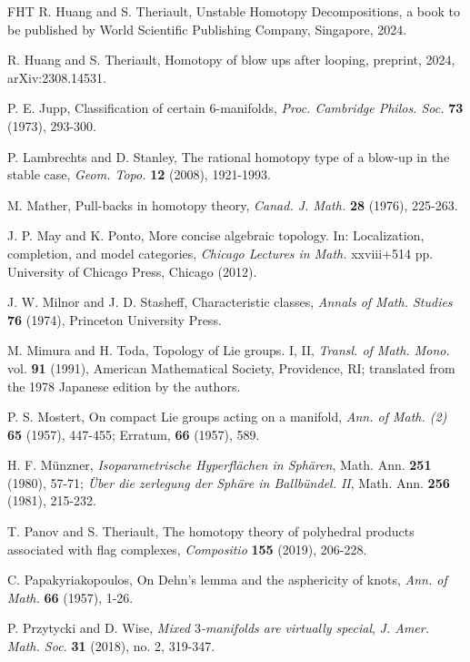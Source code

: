 \documentclass[a4]{amsart}
\theoremstyle{definition}
\begin{document}
\begin{sloppypar}
\begin{thebibliography}{FHT}
 R. Huang and S. Theriault, Unstable Homotopy Decompositions, a book to be published by World Scientific Publishing Company, Singapore, 2024.  

 R. Huang and S. Theriault, Homotopy of blow ups after looping, preprint, 2024, arXiv:2308.14531. 


 P. E. Jupp, Classification of certain $6$-manifolds, 
\emph{Proc. Cambridge Philos. Soc.} \textbf{73} (1973), 293-300.


 P. Lambrechts and D. Stanley, The rational homotopy type of a blow-up in the stable case, \emph{Geom. Topo.} \textbf{12} (2008), 1921-1993.

 M. Mather, Pull-backs in homotopy theory, \emph{Canad. J. Math.}
   \textbf{28} (1976), 225-263. 
   
 J. P. May and K. Ponto, More concise algebraic topology. In: Localization, completion, and model categories, \emph{Chicago Lectures in Math.} xxviii+514 pp. University of Chicago Press, Chicago (2012).
   
  J. W. Milnor and J. D. Stasheff, Characteristic classes, \emph{Annals of Math. Studies} \textbf{76} (1974), Princeton University Press. 
 
 
  M. Mimura and H. Toda, Topology of Lie groups. I, II, \emph{Transl. of Math. Mono.} vol. \textbf{91} (1991), American Mathematical Society, Providence, RI; translated from the 1978 Japanese edition by the authors.
 
 P. S. Mostert, On compact Lie groups acting on a manifold, \emph{Ann. of Math. (2)} \textbf{65} (1957), 447-455; Erratum, \textbf{66} (1957), 589. 
 
  H. F. M\"{u}nzner, \emph{Isoparametrische Hyperfl\"{a}chen in Sph\"{a}ren}, Math. Ann. \textbf{251} (1980), 57-71; \emph{\"{U}ber die zerlegung der Sph\"{a}re in Ballb\"{u}ndel. II}, Math. Ann. \textbf{256} (1981), 215-232.

   
 T. Panov and S. Theriault, The homotopy theory of polyhedral products associated with flag complexes, \emph{Compositio} \textbf{155} (2019), 206-228. 

 C. Papakyriakopoulos, On Dehn's lemma and the asphericity of knots, \emph{Ann. of Math.} \textbf{66} (1957), 1-26.

 P. Przytycki and D. Wise, \emph{Mixed $3$-manifolds are virtually special}, \emph{J. Amer. Math. Soc.} \textbf{31} (2018), no. 2, 319-347.


\end{thebibliography}
\end{sloppypar}
\end{document}
